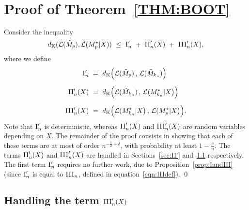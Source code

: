 \documentclass[aos,preprint]{imsart}
\numberwithin{equation}{section}
\theoremstyle{plain}
\newcommand{\I}{\textsc{I}}
\newcommand{\II}{\textsc{II}}
\newcommand{\III}{\textsc{III}}
\newcommand{\1}{{\bf{1}}}
\newcommand{\0}{\mathbf{0}}
\begin{document}
%

~\\






\section{Proof of Theorem~\ref{THM:BOOT}}\label{app:thmboot} 
\proof Consider the inequality
\begin{equation}
d_{\textup{K}}(\mathcal{L}(\tilde M_p),\mathcal{L}(M_p^{\star}| X)) \ \leq \ \I'_n \ + \ \II'_n(X) \ + \ \III'_n(X),
\end{equation}
where we define
\begin{align}
\I'_n & \ = \  d_{\text{K}}\Big(\mathcal{L}(\tilde M_p) \, , \, \mathcal{L}(\tilde M_{k_n})\Big)\\[0.2cm]
%
\II'_n(X) &\ = \ d_{\text{K}}\Big(\mathcal{L}(\tilde M_{k_n}) \, , \, \mathcal{L}( M^{\star}_{k_n}|X\big)\Big)\\[0.2cm]
%
\III'_n(X) & \ = \ d_{\text{K}}\Big(\mathcal{L}(M^{\star}_{k_n}| X\big) \, , \, \mathcal{L}( M_p^{\star} |X\big)\Big).
\end{align}
Note that $\I_n'$ is deterministic, whereas $\II_n'(X)$ and $\III_n'(X)$ are random variables depending on $X$.
The remainder of the proof consists in showing that each of these terms are at most of order $n^{-\frac 12+\delta}$, with probability at least $1-\frac cn$. The terms $\II_n'(X)$ and $\III_n'(X)$ are handled in Sections~\ref{sec:II'} and~\ref{sec:III'} respectively. The first term $\I_n'$ requires no further work, due to Proposition~\ref{prop:IandIII} (since $\I_n'$ is equal to $\III_n$, defined in equation~\eqref{eqn:IIIdef}).  \qed



%
%
%
%
%
%
%
\subsection{Handling the term $\III_n'(X)$}\label{sec:III'}
\end{document}
